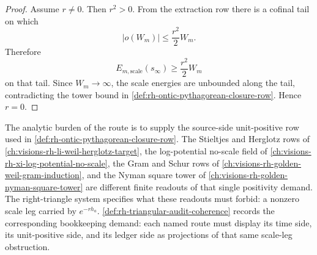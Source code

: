 \begin{proof}
Assume $r\ne0$.  Then $r^2>0$.  From the extraction row there is a
cofinal tail on which
$$
|o(W_m)|\le\frac{r^2}{2}W_m.
$$
Therefore
$$
E_{m,\mathrm{scale}}(s_\infty)\ge\frac{r^2}{2}W_m
$$
on that tail.  Since $W_m\to\infty$, the scale energies are unbounded
along the tail, contradicting the tower bound in
\autoref{def:rh-ontic-pythagorean-closure-row}.  Hence $r=0$.
\end{proof}

\begin{principle}
\label{prin:rh-invariant-target-route}
The analytic burden of the route is to supply the source-side
unit-positive row used in
\autoref{def:rh-ontic-pythagorean-closure-row}.  The Stieltjes and
Herglotz rows of \autoref{ch:visions-rh-li-weil-herglotz-target}, the
log-potential no-scale field of
\autoref{ch:visions-rh-xi-log-potential-no-scale}, the Gram and Schur
rows of \autoref{ch:visions-rh-golden-weil-gram-induction}, and the
Nyman square tower of \autoref{ch:visions-rh-golden-nyman-square-tower}
are different finite readouts of that single positivity demand.  The
right-triangle system specifies what these readouts must forbid: a
nonzero scale leg carried by $e^{-rh_a}$.
\autoref{def:rh-triangular-audit-coherence} records the corresponding
bookkeeping demand: each named route must display its time side, its
unit-positive side, and its ledger side as projections of that same
scale-leg obstruction.
\end{principle}
